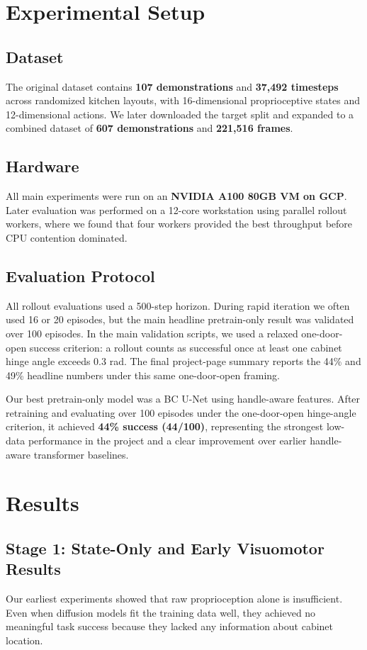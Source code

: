 \documentclass[10pt,conference]{IEEEtran}
\newcommand{\best}[1]{\textbf{#1}}
\begin{document}
\section{Experimental Setup}
\subsection{Dataset}
The original dataset contains \best{107 demonstrations} and \best{37,492 timesteps} across randomized kitchen layouts, with 16-dimensional proprioceptive states and 12-dimensional actions. We later downloaded the target split and expanded to a combined dataset of \best{607 demonstrations} and \best{221,516 frames}.

\subsection{Hardware}
All main experiments were run on an \best{NVIDIA A100 80GB VM on GCP}. Later evaluation was performed on a 12-core workstation using parallel rollout workers, where we found that four workers provided the best throughput before CPU contention dominated.

\subsection{Evaluation Protocol}
All rollout evaluations used a 500-step horizon. During rapid iteration we often used 16 or 20 episodes, but the main headline pretrain-only result was validated over 100 episodes. In the main validation scripts, we used a relaxed one-door-open success criterion: a rollout counts as successful once at least one cabinet hinge angle exceeds 0.3 rad. The final project-page summary reports the 44\% and 49\% headline numbers under this same one-door-open framing.

Our best pretrain-only model was a BC U-Net using handle-aware features. After retraining and evaluating over 100 episodes under the one-door-open hinge-angle criterion, it achieved \best{44\% success (44/100)}, representing the strongest low-data performance in the project and a clear improvement over earlier handle-aware transformer baselines.

\section{Results}
\subsection{Stage 1: State-Only and Early Visuomotor Results}
Our earliest experiments showed that raw proprioception alone is insufficient. Even when diffusion models fit the training data well, they achieved no meaningful task success because they lacked any information about cabinet location.
\end{document}

